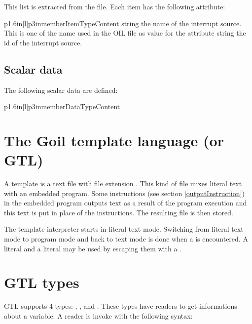 This list is extracted from the  file. Each item has the following attribute:

\begin{longtableiii}{p{1.6in}|l|p{3in}}{member}{Item}{Type}{Content}
  {string}
  {the name of the interrupt source. This is one of the name used in the OIL file as value for the  attribute}
  {string}
  {the id of the interrupt source.}
\end{longtableiii}



\subsection{Scalar data}

The following scalar data are defined:

\begin{longtableiii}{p{1.6in}|l|p{3in}}{member}{Data}{Type}{Content}

\end{longtableiii}

\section{The Goil template language (or GTL)}

A template is a text file with file extension . This kind of file mixes literal text with an embedded program. Some instructions (see section \ref{outputInstruction}) in the embedded program outputs text as a result of the program execution and this text is put in place of the instructions. The resulting file is then stored.

The template interpreter starts in literal text mode. Switching from literal text mode to program mode and back to text mode is done when a \character{\%} is encountered. A literal \character{\%} and a literal \character{\textbackslash} may be used by escaping them with a \character{\textbackslash}.

\section{GTL types}

GTL supports 4 types: , ,  and . These types have readers %
to get informations about a variable. A reader is invoke with the following syntax:


